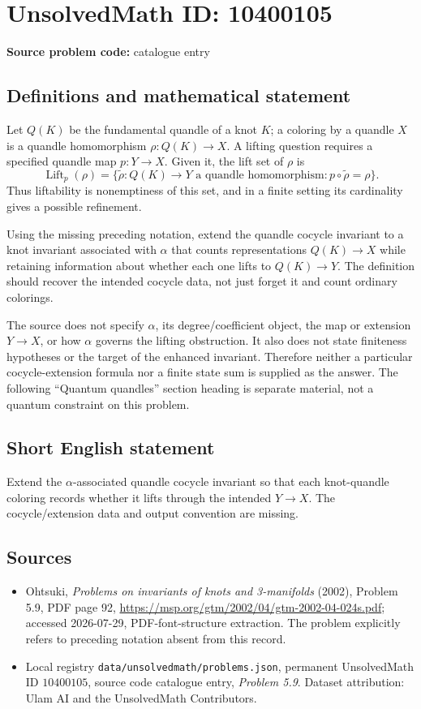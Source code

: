 \documentclass[11pt]{article}
\begin{document}
\section*{UnsolvedMath ID: 10400105}
\textbf{Source problem code:} catalogue entry
\subsection{Definitions and mathematical statement}
Let $Q(K)$ be the fundamental quandle of a knot $K$; a coloring by a quandle $X$ is a quandle homomorphism $\rho:Q(K)\to X$. A lifting question requires a specified quandle map $p:Y\to X$. Given it, the lift set of $\rho$ is
\[
\operatorname{Lift}_p(\rho)=\{\widetilde\rho:Q(K)\to Y\text{ a quandle homomorphism}:p\circ\widetilde\rho=\rho\}.
\]
Thus liftability is nonemptiness of this set, and in a finite setting its cardinality gives a possible refinement.

Using the missing preceding notation, extend the quandle cocycle invariant to a knot invariant associated with $\alpha$ that counts representations $Q(K)\to X$ while retaining information about whether each one lifts to $Q(K)\to Y$. The definition should recover the intended cocycle data, not just forget it and count ordinary colorings.

The source does not specify $\alpha$, its degree/coefficient object, the map or extension $Y\to X$, or how $\alpha$ governs the lifting obstruction. It also does not state finiteness hypotheses or the target of the enhanced invariant. Therefore neither a particular cocycle-extension formula nor a finite state sum is supplied as the answer. The following ``Quantum quandles'' section heading is separate material, not a quantum constraint on this problem.
\subsection{Short English statement}
Extend the $\alpha$-associated quandle cocycle invariant so that each knot-quandle coloring records whether it lifts through the intended $Y\to X$. The cocycle/extension data and output convention are missing.
\subsection{Sources}
\begin{itemize}
\item Ohtsuki, \emph{Problems on invariants of knots and 3-manifolds} (2002), Problem 5.9, PDF page 92, \url{https://msp.org/gtm/2002/04/gtm-2002-04-024s.pdf}; accessed 2026-07-29, PDF-font-structure extraction. The problem explicitly refers to preceding notation absent from this record.
\item Local registry \texttt{data/unsolvedmath/problems.json}, permanent UnsolvedMath ID $10400105$, source code catalogue entry, \emph{Problem 5.9}. Dataset attribution: Ulam AI and the UnsolvedMath Contributors.
\end{itemize}
\end{document}
